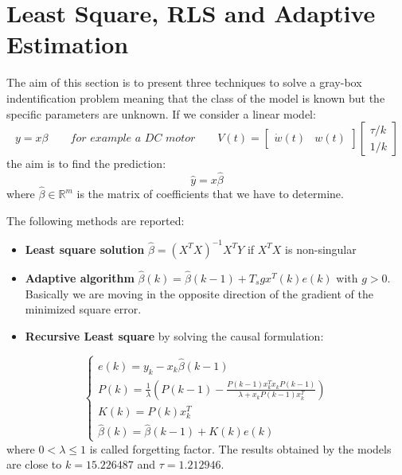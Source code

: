 \documentclass[a4paper,12pt]{article}
\begin{document}
\section{Least Square, RLS and Adaptive Estimation}
The aim of this section is to present three techniques to solve a gray-box indentification problem meaning that the class of the model is known but the specific parameters are unknown. If we consider a linear model:
\[
    y = x\beta \qquad \textit{for example a DC motor} \qquad V(t) = \begin{bmatrix}
        \dot{w}(t) & w(t) 
    \end{bmatrix} \begin{bmatrix}
        \tau/k \\ 1/k
    \end{bmatrix}
\]
the aim is to find the prediction:
\[
    \hat{y} = x \hat{\beta}
\]
where $\hat{\beta} \in \mathbb{R}^m$ is the matrix of coefficients that we have to determine.

\bigskip
\noindent The following methods are reported:
\begin{itemize}
    \item \textbf{Least square solution} $\hat{\beta} = (X^TX)^{-1}X^TY$ if $X^TX$ is non-singular
    \item \textbf{Adaptive algorithm} $\hat{\beta}(k) = \hat{\beta}(k-1) + T_sgx^T(k)e(k)$ with $g > 0$. Basically we are moving in the opposite direction of the gradient of the minimized square error.
    \item \textbf{Recursive Least square} by solving the causal formulation:
\end{itemize}
\[
    \begin{cases}
        e(k) = y_k -x_k\hat{\beta}(k-1) \\
        P(k) = \frac{1}{\lambda} \left ( P(k-1) - \frac{P(k-1)x_k^Tx_kP(k-1)}{\lambda + x_kP(k-1)x_k^T}\right) \\ 
        K(k) = P(k)x_k^T \\
        \hat{\beta}(k) = \hat{\beta}(k-1) + K(k)e(k) 
    \end{cases}
\]
where $0 < \lambda \leq 1 $ is called forgetting factor. The results obtained by the models are close to $k = 15.226487$ and $\tau = 1.212946$.
\end{document}
